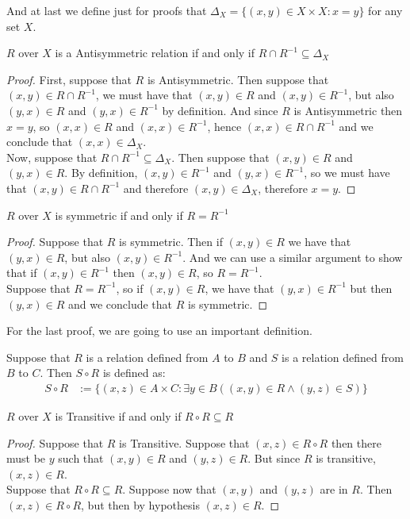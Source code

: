 \documentclass{tufte-handout}
\begin{document}
And at last we define just for proofs that $\Delta_X = \{(x, y) \in X \times X: x = y\}$ for any set $X$. 

\begin{theorem}
	$R$ over $X$ is a Antisymmetric relation if and only if $R \cap R^{-1} \subseteq \Delta_X$
\end{theorem}
\begin{proof}
	First, suppose that $R$ is Antisymmetric. Then suppose that $(x, y) \in R \cap R^{-1}$, we must have that $(x, y) \in R$ and $(x, y) \in R^{-1}$, but also $(y, x) \in R$ and $(y, x) \in R^{-1}$ by definition. And since $R$ is Antisymmetric then $x = y$, so $(x, x) \in R$ and $(x, x) \in R^{-1}$, hence $(x, x) \in R \cap R^{-1}$ and we conclude that $(x, x) \in \Delta_X$.\\

	Now, suppose that $R \cap R^{-1} \subseteq \Delta_X$. Then suppose that $(x, y) \in R$ and $(y, x) \in R$. By definition, $(x, y) \in R^{-1}$ and $(y, x) \in R^{-1}$, so we must have that $(x, y) \in R \cap R^{-1}$ and therefore $(x, y) \in \Delta_X$, therefore $x = y$.
\end{proof}

\begin{theorem}
	$R$ over $X$ is symmetric if and only if $R = R^{-1}$
\end{theorem}
\begin{proof}
	Suppose that $R$ is symmetric. Then if $(x, y) \in R$ we have that $(y, x) \in R$, but also $(x, y) \in R^{-1}$. And we can use a similar argument to show that if $(x, y) \in R^{-1}$ then $(x, y) \in R$, so $R = R^{-1}$.\\

	Suppose that $R = R^{-1}$, so if $(x, y) \in R$, we have that $(y, x) \in R^{-1}$ but then $(y, x) \in R$ and we conclude that $R$ is symmetric.
\end{proof}

For the last proof, we are going to use an important definition.
\begin{definition}
	Suppose that $R$ is a relation defined from $A$ to $B$ and $S$ is a relation defined from $B$ to $C$. Then $S \circ R$ is defined as:
	\begin{align*}
		S \circ R &:= \{(x, z) \in A \times C: \exists y \in B((x, y) \in R\wedge (y, z) \in S) \}
	\end{align*}
\end{definition}

\begin{theorem}
	$R$ over $X$ is Transitive if and only if $R \circ R \subseteq R$
\end{theorem}
\begin{proof}
	Suppose that $R$ is Transitive. Suppose that $(x, z) \in R \circ R$ then there must be $y$ such that $(x, y) \in R$ and $(y, z) \in R$. But since $R$ is transitive, $(x, z) \in R$.\\

	Suppose that $R \circ R \subseteq R$. Suppose now that $(x, y)$ and $(y, z)$ are in $R$. Then $(x, z) \in R \circ R$, but then by hypothesis $(x, z) \in R$.
\end{proof}
\end{document}
